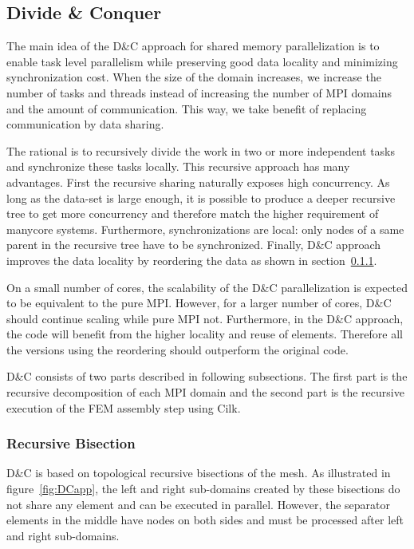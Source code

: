 \documentclass{IOS-Book-Article}
\begin{document}
\subsection{Divide \& Conquer}

The main idea of the D\&C approach for shared memory parallelization is to enable task level parallelism while preserving good data locality and minimizing synchronization cost.
When the size of the domain increases, we increase the number of tasks and threads instead of increasing the number of MPI domains and the amount of communication.
This way, we take benefit of replacing communication by data sharing.

The rational is to  recursively divide the work in two or more independent tasks and synchronize these tasks locally. This recursive approach has many advantages.
First the recursive sharing naturally exposes high concurrency. As long as the data-set is large enough, it is possible to produce a deeper recursive tree to get more concurrency and 
therefore match the higher requirement of manycore systems. Furthermore, synchronizations are local: only nodes of a same parent in the recursive tree have to be synchronized.
Finally, D\&C approach improves the data locality by reordering the data as shown in section~\ref{sec:DCrec}.

On a small number of cores, the scalability of the D\&C parallelization is expected to be equivalent to the pure MPI.
However, for a larger number of cores, D\&C should continue scaling while pure MPI not.
Furthermore, in the D\&C approach, the code will benefit from the higher locality and reuse of elements. Therefore all the versions using the reordering should outperform the original code.

D\&C consists of two parts described in following subsections.
The first part is the recursive decomposition of each MPI domain and the second part is the recursive execution of the FEM assembly step using Cilk.

\subsubsection{Recursive Bisection}
\label{sec:DCrec}
D\&C is based on topological recursive bisections of the mesh.
As illustrated in figure~\ref{fig:DCapp}, the left and right sub-domains created by these bisections do not share any element and can be executed in parallel.
However, the separator elements in the middle have nodes on both sides and must be processed after left and right sub-domains.
\end{document}
